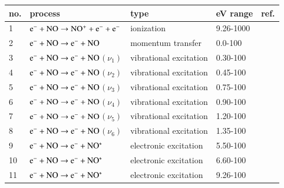 \begin{table}
  \center{}
  \begin{threeparttable}
    \label{tab:tableNO}
    \begin{tabular*}{\textwidth}{l@{\extracolsep{\fill}}llll}
    \toprule
    {no.}  & {process} & {type} &  {eV range}  &  {ref.} \\
    \midrule
      1 & $\rm e^- + NO \rightarrow NO^+ + e^- + e^-$  &  ionization   &  9.26-1000 &   \cite{lxc:2024:morgan} \\ 
      \midrule     
      2 & $\rm e^- + NO \rightarrow e^- + NO$  &  momentum transfer   &  0.0-100  & \cite{lxc:2024:morgan}\\   
      \midrule
      3 & $\rm e^- + NO \rightarrow e^- + NO$$(\nu_1) $  &  vibrational excitation   &  0.30-100 & \cite{lxc:2024:morgan}\\ 
      4 & $\rm e^- + NO \rightarrow e^- + NO$$(\nu_2) $  &  vibrational excitation   &  0.45-100 & \cite{lxc:2024:morgan}\\ 
      5 & $\rm e^- + NO \rightarrow e^- + NO$$(\nu_3) $  &  vibrational excitation   &  0.75-100 & \cite{lxc:2024:morgan}\\ 
      6 & $\rm e^- + NO \rightarrow e^- + NO$$(\nu_4) $  &  vibrational excitation   &  0.90-100 & \cite{lxc:2024:morgan}\\ 
      7 & $\rm e^- + NO \rightarrow e^- + NO$$(\nu_5) $  &  vibrational excitation   &  1.20-100 & \cite{lxc:2024:morgan}\\ 
      8 & $\rm e^- + NO \rightarrow e^- + NO$$(\nu_6) $  &  vibrational excitation   &  1.35-100 & \cite{lxc:2024:morgan}\\ 
     \midrule
      9 & $\rm e^- + NO \rightarrow e^- + NO^* $  &  electronic excitation   &  5.50-100 & \cite{lxc:2024:morgan}\\ 
     10 & $\rm e^- + NO \rightarrow e^- + NO^* $  &  electronic excitation   &  6.60-100 & \cite{lxc:2024:morgan}\\
     11 & $\rm e^- + NO \rightarrow e^- + NO^* $  &  electronic excitation   &  9.26-100 & \cite{lxc:2024:morgan}\\
    \bottomrule
    \end{tabular*}
   \end{threeparttable}
\end{table}

